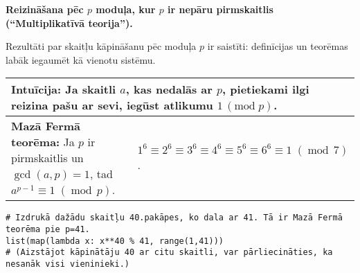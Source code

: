 \documentclass[a4paper]{article}
\begin{document}
{\bf \large Reizināšana pēc $p$ moduļa, kur $p$ ir nepāru pirmskaitlis (``Multiplikatīvā teorija'').}

\vspace{10pt}
Rezultāti par skaitļu kāpināšanu pēc moduļa $p$ ir saistīti: 
definīcijas un teorēmas labāk iegaumēt kā vienotu sistēmu.  






\renewcommand{\arraystretch}{1.2}
\begin{table}[ht!]\centering
{\small
\begin{tabular*}{18.46cm}{@{}|p{10.35cm}|p{7.25cm}|@{}} \hline
\multicolumn{2}{|p{18.05cm}|}{
\cellcolor[HTML]{E1FFE1}
Intuīcija: Ja skaitli $a$, kas nedalās ar $p$, pietiekami ilgi reizina pašu ar sevi, iegūst atlikumu $1\,(\text{mod}\;p)$.
} \\ \hline
{\bf Mazā Fermā teorēma:} Ja $p$ ir pirmskaitlis un $\operatorname{gcd}(a,p)=1$, tad\newline 
$a^{p-1} \equiv 1\;(\operatorname{mod}\,p)$. &
$1^6 \equiv 2^6 \equiv 3^6 \equiv 4^6 \equiv 5^6 \equiv 6^6 \equiv 1\;(\operatorname{mod}\,7)$. \\ \hline
\end{tabular*}
}
\end{table}

{\small
\vspace{-10pt}
\begin{Verbatim}
# Izdrukā dažādu skaitļu 40.pakāpes, ko dala ar 41. Tā ir Mazā Fermā teorēma pie p=41.
list(map(lambda x: x**40 % 41, range(1,41)))
# (Aizstājot kāpinātāju 40 ar citu skaitli, var pārliecināties, ka nesanāk visi vieninieki.)
\end{Verbatim}
}
\end{document}
